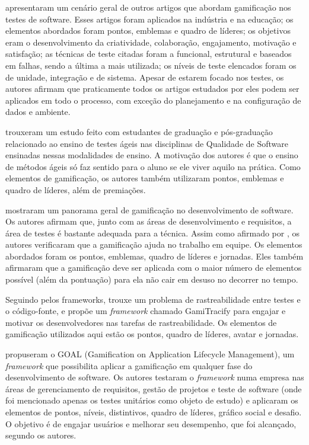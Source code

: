 \documentclass[twoside,english,brazilian]{UNISINOSartigo}
\begin{document}
\cite{DeJesus} apresentaram um cenário geral de outros artigos que abordam gamificação nos testes de software. Esses artigos foram aplicados na indústria e na educação; os elementos abordados foram pontos, emblemas e quadro de líderes; os objetivos eram o desenvolvimento da criatividade, colaboração, engajamento, motivação e satisfação; as técnicas de teste citadas foram a funcional, estrutural e baseados em falhas, sendo a última a mais utilizada; os níveis de teste elencados foram os de unidade, integração e de sistema. Apesar de estarem focado nos testes, os autores afirmam que praticamente todos os artigos estudados por eles podem ser aplicados em todo o processo, com exceção do planejamento e na configuração de dados e ambiente.

\cite{Elgrably} trouxeram um estudo feito com estudantes de graduação e pós-graduação relacionado ao ensino de testes ágeis nas disciplinas de Qualidade de Software ensinadas nessas modalidades de ensino. A motivação dos autores é que o ensino de métodos ágeis só faz sentido para o aluno se ele viver aquilo na prática. Como elementos de gamificação, os autores também utilizaram pontos, emblemas e quadro de líderes, além de premiações. 

\cite{Pedreira} mostraram um panorama geral de gamificação no desenvolvimento de software. Os autores afirmam que, junto com as áreas de desenvolvimento e requisitos, a área de testes é bastante adequada para a técnica. Assim como afirmado por \cite{Fraser01}, os autores verificaram que a gamificação ajuda no trabalho em equipe. Os elementos abordados foram os pontos, emblemas, quadro de líderes e jornadas. Eles também afirmaram que a gamificação deve ser aplicada com o maior número de elementos possível (além da pontuação) para ela não cair em desuso no decorrer no tempo.

Seguindo pelos frameworks, \cite{Parizi} trouxe um problema de rastreabilidade entre testes e o código-fonte, e propõe um \textit{framework} chamado GamiTracify para engajar e motivar os desenvolvedores nas tarefas de rastreabilidade. Os elementos de gamificação utilizados aqui estão os pontos, quadro de líderes, avatar e jornadas.

\cite{Garcia} propuseram o GOAL (Gamification on Application Lifecycle Management), um \textit{framework} que possibilita aplicar a gamificação em qualquer fase do desenvolvimento de software. Os autores testaram o \textit{framework} numa empresa nas áreas de gerenciamento de requisitos, gestão de projetos e teste de software (onde foi mencionado apenas os testes unitários como objeto de estudo) e aplicaram os elementos de pontos, níveis, distintivos, quadro de líderes, gráfico social e desafio. O objetivo é de engajar usuários e melhorar seu desempenho, que foi alcançado, segundo os autores.
\end{document}
